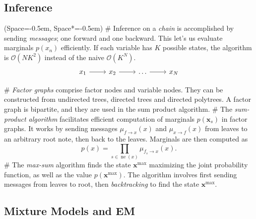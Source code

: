 \documentclass[12pt, a4paper]{article}
\newcommand{\listSpace}{-0.5em}%
\newcommand{\vect}[1]{\bm{#1}}
\begin{document}
\subsection*{Inference}
\begin{easylist}[itemize]
	\ListProperties(Space=\listSpace, Space*=\listSpace)
	# Inference on a \emph{chain} is accomplished by sending \emph{messages}; one forward and one backward.
	This let's us evaluate marginals $p(x_n)$ efficiently.
	If each variable has $K$ possible states, the algorithm is $\mathcal{O}(NK^2)$ instead of the naive $\mathcal{O}(K^N)$.
	\begin{equation*}
		\begin{tikzcd}
		x_1 \arrow{r} & x_2 \arrow{r} & \ldots \arrow{r} & x_N
		\end{tikzcd}
	\end{equation*}
	
	# \emph{Factor graphs} comprise factor nodes and variable nodes.
	They can be constructed from undirected trees, directed trees and directed polytrees.
	A factor graph is bipartite, and they are used in the sum product algorithm.
	# The \emph{sum-product algorithm} facilitates efficient computation of marginals $p(\vect{x}_s)$ in factor graphs.
	It works by sending messages $\mu_{f \to x}(x)$ and $\mu_{x \to f}(x)$ from leaves to an arbitrary root note, then back to the leaves.
	Marginals are then computed as
	\begin{equation*}
		p(x) = \prod_{s \in \operatorname{ne}(x)} \mu_{f_s \to x}(x).
	\end{equation*}
	# The \emph{max-sum} algorithm finds the state $\vect{x}^{\operatorname{max}}$ maximizing the joint probability function, as well as the value $p(\vect{x}^{\operatorname{max}})$.
	The algorithm involves first sending messages from leaves to root, then \emph{backtracking} to find the state $\vect{x}^{\operatorname{max}}$.
\end{easylist}

\subsection{Mixture Models and EM}
\end{document}
